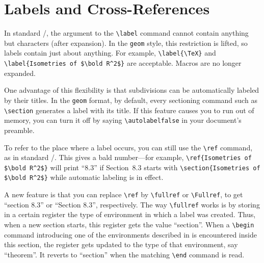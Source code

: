 \section{Labels and Cross-References}

In standard \latex/, the argument to the \verb+\label+ command cannot
contain anything but characters (after expansion).  In the \verb+geom+
style, this restriction is lifted, so labels contain just about
anything.  For example, \verb+\label{\TeX}+ and
\verb+\label{Isometries of $\bold R^2$}+ are acceptable.  Macros are
no longer expanded.

One advantage of this flexibility is that subdivisions can be
automatically labeled by their titles.  In the \verb+geom+ format, by
default, every sectioning command such as \verb+\section+ generates a
label with its title. If this feature causes you to run out of
memory, you can turn it off by saying \verb+\autolabelfalse+ in your
document's preamble.

To refer to the place where a label occurs, you can still use the
\verb+\ref+ command, as in standard \latex/.  This gives a bald
number---for example, \verb+\ref{+{\tt Isometries of }\verb+$\bold R^2$}+ will
print ``8.3'' if Section~8.3 starts with 
\verb+\section{+{\tt Isometries of }\verb+$\bold R^2$}+ 
while automatic labeling is in effect.

A new feature is that you can
replace \verb+\ref+ by \verb+\fullref+ or \verb+\Fullref+, to get
``section 8.3'' or ``Section 8.3'', respectively.
The way \verb+\fullref+ works is by storing in a certain register the
type of environment in which a label was created.  Thus, when
a new section starts, this register gets the value ``section''.  When
a \verb+\begin+ command introducing
one of the environments described in  is encountered
inside this section, the register gets updated to the type of that
environment, say ``theorem''.  It reverts to ``section'' when
the matching \verb+\end+ command is read.

